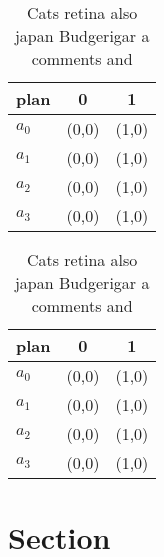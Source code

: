 \documentclass[a4paper]{article}
\begin{document}
\begin{table}
\begin{adjustbox}{width=1\columnwidth}
\begin{tabular}{|l|l|l|}
\hline
\textbf{plan} & \multicolumn{1}{c|}{\textbf{0}} & \multicolumn{1}{c|}{\textbf{1}} \\ \hline
\textbf{$a_0$}  & (0,0) & (1,0) \\ \hline
\textbf{$a_1$}  & (0,0) & (1,0) \\ \hline
\textbf{$a_2$}  & (0,0) & (1,0) \\ \hline
\textbf{$a_3$}  & (0,0) & (1,0) \\ \hline
\end{tabular}
\end{adjustbox}
\caption{Cats retina also japan Budgerigar a comments and 
}
\end{table}

\begin{table}
\begin{adjustbox}{width=1\columnwidth}
\begin{tabular}{|l|l|l|}
\hline
\textbf{plan} & \multicolumn{1}{c|}{\textbf{0}} & \multicolumn{1}{c|}{\textbf{1}} \\ \hline
\textbf{$a_0$}  & (0,0) & (1,0) \\ \hline
\textbf{$a_1$}  & (0,0) & (1,0) \\ \hline
\textbf{$a_2$}  & (0,0) & (1,0) \\ \hline
\textbf{$a_3$}  & (0,0) & (1,0) \\ \hline
\end{tabular}
\end{adjustbox}
\caption{Cats retina also japan Budgerigar a comments and 
}
\end{table}

\section{Section}
\end{document}
